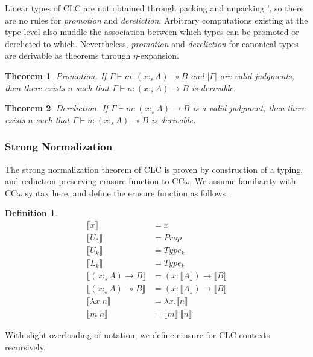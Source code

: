 \documentclass[sigplan,screen,review,authordraft]{acmart}
\newtheorem{theorem}{Theorem}[section]
\theoremstyle{definition}
\newtheorem{definition}{Definition}[section]
\newcommand{\pure}[1]{|#1|}
\newcommand{\stype}[1]{:_#1}
\newcommand{\erase}[1]{\llbracket #1 \rrbracket}
\begin{document}
  Linear types of CLC are not obtained through packing and unpacking !, so there are no rules for \textit{promotion} and \textit{dereliction}. Arbitrary computations existing at the type level also muddle the association between which types can be promoted or derelicted to which. Nevertheless, \textit{promotion} and \textit{dereliction} for canonical types are derivable as theorems through $\eta$-expansion.

  \begin{theorem} 
    Promotion. If $\Gamma \vdash m : (x \stype{s} A) \multimap B$ and $\pure{\Gamma}$ are valid judgments, then there exists $n$ such that $\Gamma \vdash n : (x \stype{s} A) \rightarrow B$ is derivable.
  \end{theorem}

  \begin{theorem} 
    Dereliction. If $\Gamma \vdash m : (x \stype{s} A) \rightarrow B$ is a valid judgment, then there exists $n$ such that $\Gamma \vdash n : (x \stype{s} A) \multimap B$ is derivable.
  \end{theorem}

  \subsubsection{Strong Normalization}
  The strong normalization theorem of CLC is proven by construction of a typing, and reduction preserving erasure function to CC$\omega$. We assume familiarity with CC$\omega$ syntax here, and define the erasure function as follows.

  \begin{definition}
    \begin{align*}
      \erase{x} &= x \\
      \erase{U_*} &= Prop \\
      \erase{U_k} &= Type_k \\
      \erase{L_k} &= Type_k \\
      \erase{(x \stype{s} A) \rightarrow B} &= (x : \erase{A}) \rightarrow \erase{B} \\
      \erase{(x \stype{s} A) \multimap B} &= (x : \erase{A}) \rightarrow \erase{B} \\
      \erase{\lambda x.n} &= \lambda x.\erase{n} \\
      \erase{m\ n} &= \erase{m}\ \erase{n}
    \end{align*}
  \end{definition}

  With slight overloading of notation, we define erasure for CLC contexts recursively.
\end{document}
